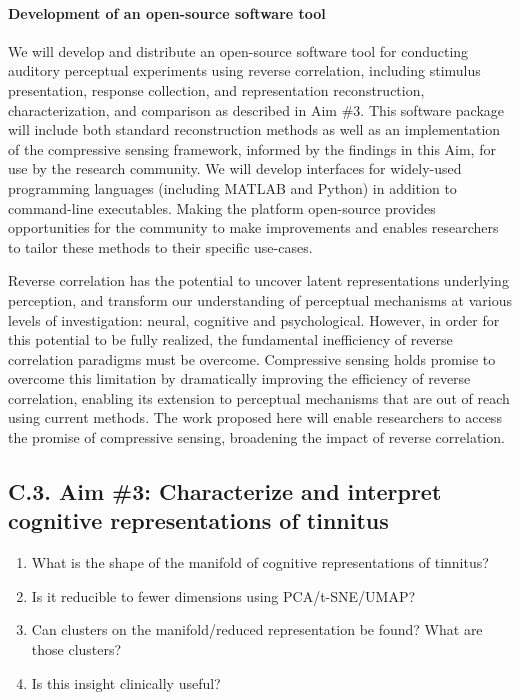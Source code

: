 \documentclass[11pt, notitlepage]{article} %
\begin{document}
\paragraph{Development of an open-source software tool}

We will develop and distribute an open-source software tool for conducting
auditory perceptual experiments using reverse correlation,
including stimulus presentation, response collection,
and representation reconstruction, characterization, and comparison
as described in Aim \#3.
This software package will include both standard reconstruction methods
as well as an implementation of the compressive sensing framework,
informed by the findings in this Aim, for use by the research community.
We will develop interfaces for widely-used programming languages
(including MATLAB and Python) in addition to command-line executables.
Making the platform open-source provides opportunities for the community
to make improvements and enables researchers to tailor these methods to their specific use-cases.

Reverse correlation has the potential to uncover latent representations underlying perception, and
transform our understanding of perceptual mechanisms at various levels of investigation: neural, cognitive
and psychological. However, in order for this potential to be fully realized, the fundamental inefficiency of
reverse correlation paradigms must be overcome. Compressive sensing holds promise to overcome this
limitation by dramatically improving the efficiency of reverse correlation, enabling its extension to
perceptual mechanisms that are out of reach using current methods. The work proposed here will enable
researchers to access the promise of compressive sensing, broadening the impact of reverse correlation.

\subsection*{C.3. Aim \#3: Characterize and interpret cognitive representations of tinnitus}

\begin{enumerate}
	\item What is the shape of the manifold of cognitive representations of tinnitus?
	\item Is it reducible to fewer dimensions using PCA/t-SNE/UMAP?
	\item Can clusters on the manifold/reduced representation be found?
	What are those clusters?
	\item Is this insight clinically useful?
\end{enumerate}
\end{document}
